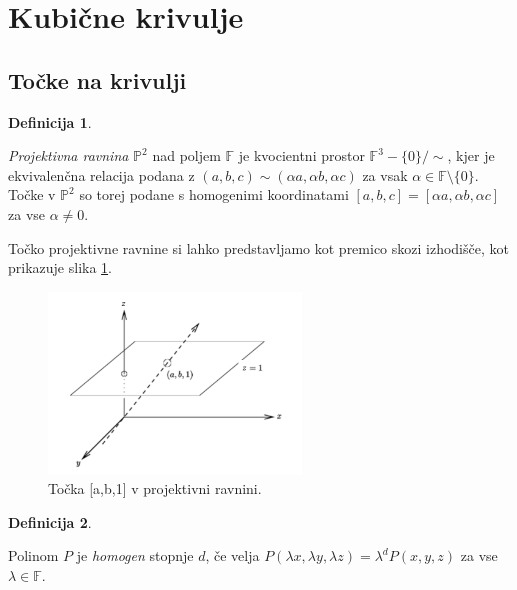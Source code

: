 \documentclass[12pt,a4paper,twoside]{article}
\theoremstyle{definition} %
\newtheorem{definicija}{Definicija}[section]
\theoremstyle{plain} %
\numberwithin{equation}{section}  %
\newcommand{\F}{\mathbb F}
\begin{document}
\newpage

\section{Kubične krivulje}

\subsection{Točke na krivulji}

\begin{definicija}~

\emph{Projektivna ravnina} $\mathbb{P}^2$ nad poljem $\F$ je kvocientni prostor $\F^3-\{0\}/\! \!\sim$, kjer je ekvivalenčna relacija podana z $(a,b,c)\sim(\alpha a,\alpha b,\alpha c)$ za vsak $\alpha \in \F \setminus \{0\}$. Točke v $\mathbb{P}^2$ so torej podane s homogenimi koordinatami $[a,b,c] = [\alpha a,\alpha b,\alpha c]$ za vse $\alpha \neq 0$.
\end{definicija} 

Točko projektivne ravnine si lahko predstavljamo kot premico skozi izhodišče, kot prikazuje slika \ref{fig:ravnina}.


\begin{figure}[h]
  \centering
  \includegraphics[width=0.6\textwidth]{images/ravnina.png}
  \caption[Primer točke v projektivni ravnini.]{Točka [a,b,1] v projektivni ravnini.}
  \label{fig:ravnina}
\end{figure}


\begin{definicija}~

Polinom $P$ je \emph{homogen} stopnje $d$, če velja $P(\lambda x,\lambda y, \lambda z) = \lambda ^d P(x,y,z)$ za vse $\lambda \in \F$.
\end{definicija}
\end{document}
